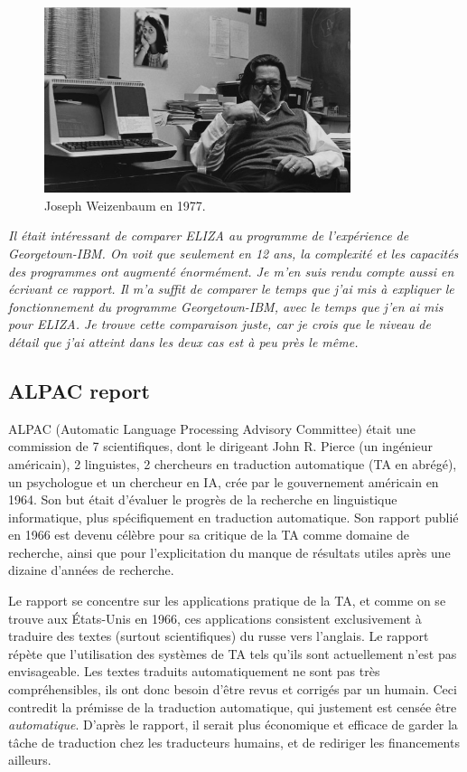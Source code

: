 \documentclass[11pt, a4paper]{report}
\begin{document}
\begin{figure}[h]
  \centering
  \includegraphics[width=0.8\textwidth]{weizenbaum.jpg}
  \caption{Joseph Weizenbaum en 1977.}
  \label{fig:weizenbaum}
\end{figure}

\textit{Il était intéressant de comparer ELIZA au programme de l'expérience de Georgetown-IBM. 
On voit que seulement en 12 ans, la complexité et les capacités des programmes ont augmenté 
énormément. Je m'en suis rendu compte aussi en écrivant ce rapport. Il m'a suffit de comparer 
le temps que j'ai mis à expliquer le fonctionnement du programme Georgetown-IBM, avec le temps 
que j'en ai mis pour ELIZA. Je trouve cette comparaison juste, car je crois que le niveau de 
détail que j'ai atteint dans les deux cas est à peu près le même. }


  \subsection{ALPAC report} 
  \cite{alpac-original}
  \cite{alpac-hutchins}
  ALPAC (Automatic Language Processing Advisory Committee) était une commission de 7 scientifiques, 
  dont le dirigeant John R. Pierce (un ingénieur américain), 2 linguistes, 2 chercheurs en traduction 
  automatique (TA en abrégé), un psychologue et un chercheur en IA, 
  crée par le gouvernement américain en 1964. Son but était d'évaluer le progrès de la 
  recherche en linguistique informatique, plus spécifiquement en traduction automatique. Son rapport 
  publié en 1966 est devenu célèbre pour sa critique de la TA comme domaine de recherche, 
  ainsi que pour l'explicitation du manque de résultats utiles après une dizaine d'années de recherche. 

  Le rapport se concentre sur les applications pratique de la TA, et comme on se trouve aux 
  États-Unis en 1966, ces applications consistent exclusivement à traduire des textes 
  (surtout scientifiques) du russe vers l'anglais. Le rapport répète que l'utilisation des 
  systèmes de TA tels qu'ils sont actuellement n'est pas envisageable. Les textes traduits 
  automatiquement ne sont pas très compréhensibles, ils ont donc besoin d'être revus et 
  corrigés par un humain. Ceci contredit la prémisse de la traduction automatique, qui justement est
  censée être \textit{automatique}. D'après le rapport, il serait plus économique et efficace 
  de garder la tâche de traduction chez les traducteurs humains, et de rediriger les financements 
  ailleurs. 
\end{document}
